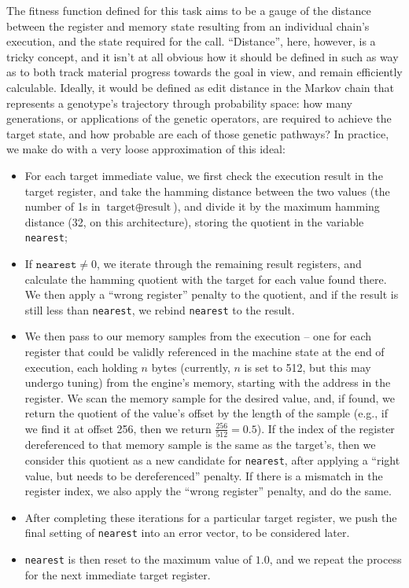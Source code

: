 \documentclass[12pt,glossary]{dalthesis}
\begin{document}
The fitness function defined for this task aims to be a gauge of the distance between
the register and memory state resulting from an individual chain's execution, and
the state required for the call. ``Distance'', here, however, is a tricky concept, and
it isn't at all obvious how it should be defined in such as way as to both track
material progress towards the goal in view, and remain efficiently calculable. Ideally,
it would be defined as edit distance in the Markov chain that represents a genotype's
trajectory through probability space: how many generations, or applications of the
genetic operators, are required to achieve the target state, and how probable are each
of those genetic pathways? In practice, we make do with a very loose approximation of
this ideal:

\begin{itemize}
\item For each target immediate value, we first check the execution result in the target register,
and take the hamming distance between the two values (the number of 1s in 
\(\text{target} \oplus \text{result}\)), and divide it by the maximum hamming distance
(32, on this architecture), storing the quotient in the variable \texttt{nearest};
\item If \(\texttt{nearest} \neq 0\), we iterate through the remaining result registers,
and calculate the hamming quotient with the target for each value found there. We
then apply a ``wrong register'' penalty to the quotient, and if the result is still
less than \texttt{nearest}, we rebind \texttt{nearest} to the result.
\item We then pass to our memory samples from the execution -- one for each register that
could be validly referenced in the machine state at the end of execution, each holding
\(n\) bytes (currently, \(n\) is set to 512, but this may undergo tuning) from the
engine's memory, starting with the address in the register. We scan the memory
sample for the desired value, and, if found, we return the quotient of the value's
offset by the length of the sample (e.g., if we find it at offset 256, then we
return \(\frac{256}{512} = 0.5\)). If the index of the register dereferenced to
that memory sample is the same as the target's, then we consider this quotient
as a new candidate for \texttt{nearest}, after applying a ``right value, but needs to be
dereferenced'' penalty. If there is a mismatch in the register index, we also 
apply the ``wrong register'' penalty, and do the same.
\item After completing these iterations for a particular target register, 
we push the final setting of \texttt{nearest} into an error vector, to be considered later.
\item \texttt{nearest} is then reset to the maximum value of \(1.0\), and we repeat the process for
the next immediate target register.


\end{itemize}
\end{document}
